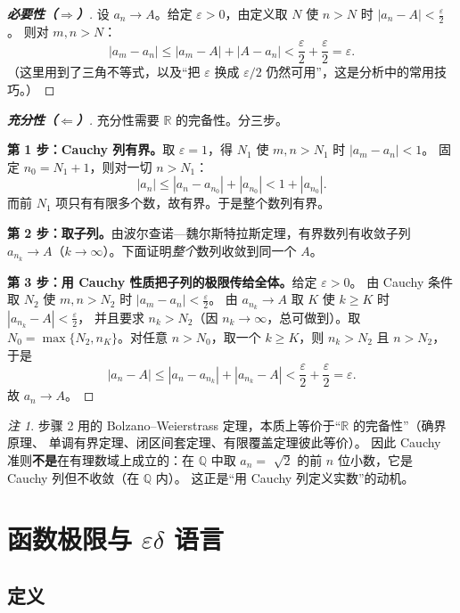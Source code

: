 \documentclass[11pt,a4paper]{ctexart}
\theoremstyle{definition}
\theoremstyle{remark}
\newtheorem*{remark}{注}
\newcommand{\R}{\mathbb{R}}
\newcommand{\Q}{\mathbb{Q}}
\newcommand{\eps}{\varepsilon}
\newcommand{\abs}[1]{\left\lvert #1 \right\rvert}
\begin{document}
\begin{proof}[\bfseries 必要性（$\Rightarrow$）]
设 $a_n\to A$。给定 $\eps>0$，由定义取 $N$ 使 $n>N$ 时 $\abs{a_n-A}<\frac{\eps}{2}$。
则对 $m,n>N$：
\[
  \abs{a_m-a_n}\le\abs{a_m-A}+\abs{A-a_n}<\frac\eps2+\frac\eps2=\eps .
\]
（这里用到了三角不等式，以及“把 $\eps$ 换成 $\eps/2$ 仍然可用”，这是分析中的常用技巧。）

\end{proof}

\begin{proof}[\bfseries 充分性（$\Leftarrow$）]
充分性需要 $\R$ 的完备性。分三步。

\textbf{第 1 步：Cauchy 列有界。}取 $\eps=1$，得 $N_1$ 使 $m,n>N_1$ 时 $\abs{a_m-a_n}<1$。
固定 $n_0=N_1+1$，则对一切 $n>N_1$：
\[
  \abs{a_n}\le\abs{a_n-a_{n_0}}+\abs{a_{n_0}}<1+\abs{a_{n_0}}.
\]
而前 $N_1$ 项只有有限多个数，故有界。于是整个数列有界。

\textbf{第 2 步：取子列。}由波尔查诺—魏尔斯特拉斯定理，有界数列有收敛子列
$a_{n_k}\to A$（$k\to\infty$）。下面证明\emph{整个}数列收敛到同一个 $A$。

\textbf{第 3 步：用 Cauchy 性质把子列的极限传给全体。}给定 $\eps>0$。
由 Cauchy 条件取 $N_2$ 使 $m,n>N_2$ 时 $\abs{a_m-a_n}<\frac\eps2$。
由 $a_{n_k}\to A$ 取 $K$ 使 $k\ge K$ 时 $\abs{a_{n_k}-A}<\frac\eps2$，
并且要求 $n_k>N_2$（因 $n_k\to\infty$，总可做到）。取
$N_0=\max\{N_2,n_K\}$。对任意 $n>N_0$，取一个 $k\ge K$，则 $n_k>N_2$ 且 $n>N_2$，于是
\[
  \abs{a_n-A}\le\abs{a_n-a_{n_k}}+\abs{a_{n_k}-A}<\frac\eps2+\frac\eps2=\eps .
\]
故 $a_n\to A$。

\end{proof}

\begin{remark}
步骤 2 用的 Bolzano--Weierstrass 定理，本质上等价于“$\R$ 的完备性”（确界原理、
单调有界定理、闭区间套定理、有限覆盖定理彼此等价）。
因此 Cauchy 准则\textbf{不是}在有理数域上成立的：在 $\Q$ 中取
$a_n=$ $\sqrt2$ 的前 $n$ 位小数，它是 Cauchy 列但不收敛（在 $\Q$ 内）。
这正是“用 Cauchy 列定义实数”的动机。
\end{remark}

\newpage

\section{函数极限与 $\varepsilon$\text{-}$\delta$ 语言}

\subsection{定义}
\end{document}
